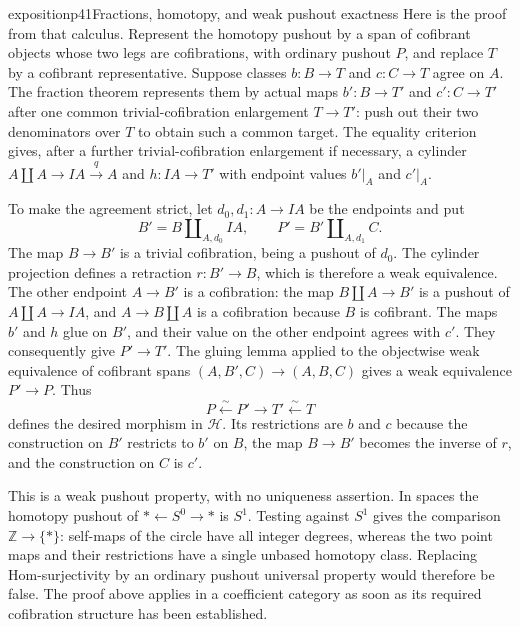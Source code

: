 \begin{dcomment}{exposition}{p41}{Fractions, homotopy, and weak pushout exactness}
Here is the proof from that calculus. Represent the homotopy pushout by a span of cofibrant objects whose two legs are cofibrations, with ordinary pushout $P$, and replace $T$ by a cofibrant representative. Suppose classes $b:B\to T$ and $c:C\to T$ agree on $A$. The fraction theorem represents them by actual maps $b':B\to T'$ and $c':C\to T'$ after one common trivial-cofibration enlargement $T\to T'$: push out their two denominators over $T$ to obtain such a common target. The equality criterion gives, after a further trivial-cofibration enlargement if necessary, a cylinder $A\amalg A\to IA\xrightarrow{q}A$ and $h:IA\to T'$ with endpoint values $b'|_A$ and $c'|_A$.

To make the agreement strict, let $d_0,d_1:A\to IA$ be the endpoints and put
\[
 B'=B\amalg_{A,d_0}IA,
 \qquad P'=B'\amalg_{A,d_1}C.
\]
The map $B\to B'$ is a trivial cofibration, being a pushout of $d_0$. The cylinder projection defines a retraction $r:B'\to B$, which is therefore a weak equivalence. The other endpoint $A\to B'$ is a cofibration: the map $B\amalg A\to B'$ is a pushout of $A\amalg A\to IA$, and $A\to B\amalg A$ is a cofibration because $B$ is cofibrant. The maps $b'$ and $h$ glue on $B'$, and their value on the other endpoint agrees with $c'$. They consequently give $P'\to T'$. The gluing lemma applied to the objectwise weak equivalence of cofibrant spans $(A,B',C)\to(A,B,C)$ gives a weak equivalence $P'\to P$. Thus
\[
 P\xleftarrow{\sim}P'\longrightarrow T'\xleftarrow{\sim}T
\]
defines the desired morphism in $\mathcal H$. Its restrictions are $b$ and $c$ because the construction on $B'$ restricts to $b'$ on $B$, the map $B\to B'$ becomes the inverse of $r$, and the construction on $C$ is $c'$.

This is a weak pushout property, with no uniqueness assertion. In spaces the homotopy pushout of $*\leftarrow S^0\to *$ is $S^1$. Testing against $S^1$ gives the comparison $\mathbb Z\to\{*\}$: self-maps of the circle have all integer degrees, whereas the two point maps and their restrictions have a single unbased homotopy class. Replacing Hom-surjectivity by an ordinary pushout universal property would therefore be false. The proof above applies in a coefficient category as soon as its required cofibration structure has been established.
\end{dcomment}

